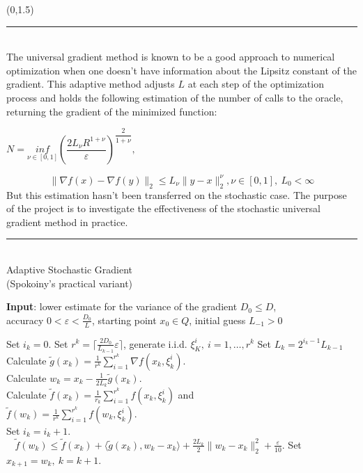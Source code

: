 \documentclass[a0]{a0poster}
\def\Head#1{\noindent{\LARGE\color{bluegray} #1}\bigskip}
\begin{document}
\begin{textblock}{7.0}(0,1.5)

\hrule\medskip
\Head{Introduction}\\
The universal gradient method is known to be a good approach to numerical optimization when one doesn't have information about the Lipsitz constant of the gradient. This adaptive method adjusts $L$ at each step of the optimization process and holds the following estimation of the number of calls to the oracle, returning the gradient of the minimized function:
\begin{center}$N=\underset{\nu\in[0,1]}{inf}\left(\dfrac{2L_{\nu}R^{1+\nu}}{\varepsilon}\right)^{\dfrac{2}{1+\nu}},$\end{center}
$$ \|\nabla f(x)-\nabla f(y)\|_2\le L_{\nu}\|y-x\|_2^{\nu}, \nu \in [0,1],~L_0 < \infty$$
But this estimation hasn't been transferred on the stochastic case. The purpose of the project is to investigate the effectiveness of the stochastic universal gradient method in practice. 

\medskip
\hrule\medskip
\Head{Algorithm}\\
{\Large{Adaptive Stochastic Gradient \\(Spokoiny's practical variant)}}

    \hspace*{\algorithmicindent} \textbf{Input}: lower estimate for the variance of the gradient $D_0 \le D$,\\ accuracy $0 < \varepsilon< \frac{D_0}{L}$, starting point $x_0 \in Q$, initial guess $L_{-1} > 0$
	\label{RKalg}
	\begin{algorithmic}[1] 
		\STATE Set $i_k=0$. Set $r^k = \lceil \frac{2 D_0}{L_{k-1}} {\varepsilon}\rceil$, generate i.i.d. $\xi^i_K, ~i = 1,\dots, r^k$
		\REPEAT
		\STATE Set $L_k = 2 ^{i_k-1}L_{k-1}$
		\\
		\STATE Calculate $\tilde{g}(x_k) = \frac{1}{r^k}\sum_{i=1}^{r^k}\nabla f(x_k, \xi^i_k)$.
		\\
		\STATE Calculate $w_k = x_k - \frac{1}{2 L_k}\tilde{g}(x_k)$.
		\\
		\STATE Calculate $\tilde{f}(x_k) = \frac{1}{r_k}\sum_{i=1}^{r^k}f(x_k, \xi^i_k)$ and\\ $\tilde{f}(w_k) = \frac{1}{r^k}\sum_{i=1}^{r^k}f(w_k, \xi^i_k)$.
		\\
		\STATE Set $i_k = i_k + 1$.
		\UNTIL \\$~~~~\tilde{f}(w_k) \le \tilde{f}(x_k) + \langle\tilde{g}(x_k), w_k - x_k\rangle + \frac{2 L_k}{2}\|w_k - x_k\|_2^2 + \frac{\varepsilon}{10}$.
		\STATE Set $x_{k+1} = w_k,~k=k+1$.
		\ENDFOR
	\end{algorithmic}


\end{textblock}
\end{document}
